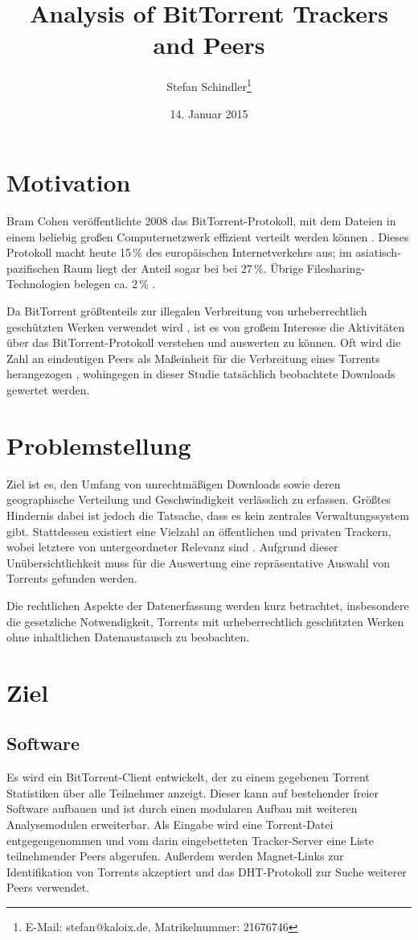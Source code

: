 \documentclass[a4paper]{scrartcl} %
\title{Analysis of BitTorrent Trackers and Peers}
\author{Stefan Schindler\thanks{E-Mail: stefan@kaloix.de, Matrikelnummer: 21676746}}
\date{14. Januar 2015}
\begin{document}
\maketitle

\section{Motivation}
Bram Cohen veröffentlichte 2008 das BitTorrent-Protokoll, mit dem Dateien in einem beliebig großen Computernetzwerk effizient verteilt werden können \cite{bep3}. Dieses Protokoll macht heute 15\,\% des europäischen Internetverkehrs aus; im asiatisch-pazifischen Raum liegt der Anteil sogar bei bei 27\,\%. Übrige Filesharing-Technologien belegen ca. 2\,\% \cite{sandvine2014}.

Da BitTorrent größtenteils zur illegalen Verbreitung von urheberrechtlich geschützten Werken verwendet wird \cite{watters2011much}, ist es von großem Interesse die Aktivitäten über das BitTorrent-Protokoll verstehen und auswerten zu können. Oft wird die Zahl an eindeutigen Peers als Maßeinheit für die Verbreitung eines Torrents herangezogen \cite{drachen2011distribution}, wohingegen in dieser Studie tatsächlich beobachtete Downloads gewertet werden.

\section{Problemstellung}
Ziel ist es, den Umfang von unrechtmäßigen Downloads sowie deren geographische Verteilung und Geschwindigkeit verlässlich zu erfassen. Größtes Hindernis dabei ist jedoch die Tatsache, dass es kein zentrales Verwaltungssystem gibt. Stattdessen existiert eine Vielzahl an öffentlichen und privaten Trackern, wobei letztere von untergeordneter Relevanz sind \cite{sitescomparison}. Aufgrund dieser Unübersichtlichkeit muss für die Auswertung eine repräsentative Auswahl von Torrents gefunden werden.

Die rechtlichen Aspekte der Datenerfassung werden kurz betrachtet, insbesondere die gesetzliche Notwendigkeit, Torrents mit urheberrechtlich geschützten Werken ohne inhaltlichen Datenaustausch zu beobachten.

\section{Ziel}
\subsection{Software}
Es wird ein BitTorrent-Client entwickelt, der zu einem gegebenen Torrent Statistiken über alle Teilnehmer anzeigt. Dieser kann auf bestehender freier Software aufbauen und ist durch einen modularen Aufbau mit weiteren Analysemodulen erweiterbar. Als Eingabe wird eine Torrent-Datei entgegengenommen und vom darin eingebetteten Tracker-Server eine Liste teilnehmender Peers abgerufen. Außerdem werden Magnet-Links \cite{bep9} zur Identifikation von Torrents akzeptiert und das DHT-Protokoll \cite{bep5} zur Suche weiterer Peers verwendet.
\end{document}
